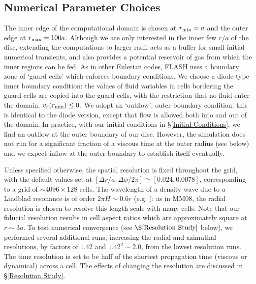 \subsection{Numerical Parameter Choices}
\label{Numerical Parameter Choices}

The inner edge of the computational domain
is chosen at $r_{\rm min}=a$ and the outer edge at $r_{\rm max}=100a$.
Although we are only interested in the inner few $r/a$ of the disc,
extending the computations to larger radii acts as a buffer for small
initial numerical transients, and also provides a potential reservoir of gas
from which the inner regions can be fed.  As in other Eulerian codes,
FLASH uses a boundary zone of `guard cells' which enforces boundary
conditions. We choose a diode-type inner boundary condition: the values
of fluid variables in cells bordering the guard cells are copied into
the guard cells, with the restriction that no fluid enter the domain,
$v_r(r_{\rm min}) \leq 0$.  We adopt an `outflow', outer boundary
condition: this is identical to the diode version, except that flow is
allowed both into and out of the domain. In practice, with our initial
conditions in \S \ref{Initial Conditions}, we find an outflow
at the outer boundary of our disc. However, the simulation does not
run for a significant fraction of a viscous time at the outer
radius (see below) and we expect inflow at the outer boundary to establish itself eventually.

Unless specified otherwise, the spatial resolution is fixed throughout the grid, with the default
values set at $\left[ \Delta r/a, \Delta \phi/2\pi \right] \simeq
\left[0.024, 0.0078\right]$, corresponding to a grid of $\sim 4096
\times 128$ cells.  The wavelength of a density wave due to a Lindblad
resonance is of order $2 \pi H \sim0.6r$
(e.g. \citealt{DRS2011,DM2012}); as in MM08, the radial resolution is
chosen to resolve this length scale with many cells. Note that our fiducial resolution 
results in cell aspect ratios which are approximately square at $r \sim 3a$. To test
numerical convergence (see $\S \ref{Resolution Study}$ below), we
performed several additional runs, increasing the radial and azimuthal
resolutions, by factors of $1.42$ and $1.42^2\sim 2.0$, from the lowest resolution runs.
The time resolution is set to be half of the shortest propagation time
(viscous or dynamical) across a cell.  The effects of changing the
resolution are discussed in \S \ref{Resolution Study}.

